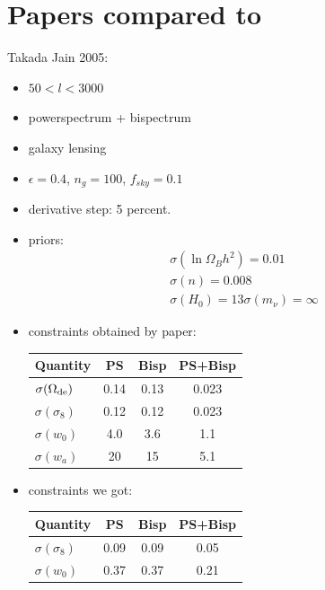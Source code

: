 \documentclass[11pt]{article} %
\begin{document}
\section{Papers compared to}
Takada Jain 2005:
\begin{itemize}
    \item $ 50 < l < 3000$
    \item powerspectrum + bispectrum
    \item galaxy lensing
    \item $\epsilon = 0.4$, $n_g = 100$, $f_{sky}=0.1$
    \item derivative step: 5 percent.
    \item priors:
    \begin{gather*}
        \sigma(\ln \Omega_B h^2) = 0.01\\
        \sigma(n) = 0.008\\
        \sigma(H_0) = 13
        \sigma(m_\nu) = \infty
    \end{gather*}
    \item constraints obtained by paper:
    \begin{table}[h!]
        \centering
        \begin{tabular}{lccc}
          \hline
          Quantity                & PS   & Bisp & PS+Bisp \\
          \hline
          $\sigma(\Omega_{\rm de})$ & 0.14 & 0.13 & 0.023   \\
          $\sigma(\sigma_8)$        & 0.12 & 0.12 & 0.023   \\
          $\sigma(w_0)$             & 4.0  & 3.6  & 1.1     \\
          $\sigma(w_a)$             & 20   & 15   & 5.1     \\
          \hline
        \end{tabular}
      \end{table}
      \item constraints we got:
      \begin{table}[h!]
        \centering
        \begin{tabular}{lccc}
          \hline
          Quantity                & PS   & Bisp & PS+Bisp \\
          \hline
          $\sigma(\sigma_8)$        & 0.09 & 0.09 & 0.05   \\
          $\sigma(w_0)$             & 0.37  & 0.37  & 0.21     \\
          \hline
        \end{tabular}
      \end{table}
\end{itemize}
\end{document}
